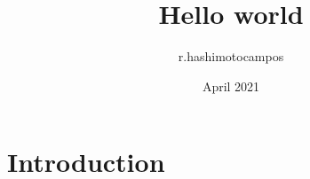 \documentclass{article}
\title{Hello world}
\author{r.hashimotocampos }
\date{April 2021}
\begin{document}
\maketitle

\section{Introduction}
\end{document}
